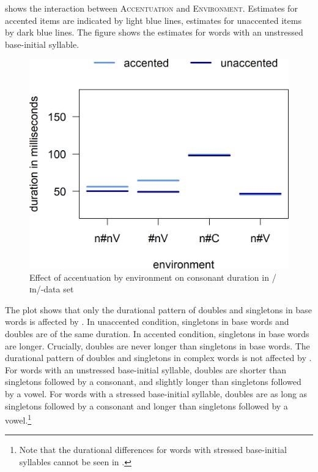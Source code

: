  shows the interaction between \textsc{Accentuation} and \textsc{Environment}. Estimates for accented items are indicated by light blue lines, estimates for unaccented items by dark blue lines. The figure shows the estimates for words with an unstressed base-initial syllable. 


	\begin{figure}
		
		
		\includegraphics [scale=0.5] {images/Experiment/InModelCompleteInterEnvAcc} 
		\caption{Effect of accentuation by environment on consonant duration in /ɪn/-data set}
		\label{fig:Env Acc In complete experiment}
	\end{figure}

\largerpage The plot shows that only the durational pattern of doubles and singletons in base words is affected by . 
In unaccented condition, singletons in base words and doubles are of the same duration. In accented condition, singletons in base words are longer. Crucially, doubles are never longer than singletons in base words.
The durational pattern of doubles and singletons in complex words is not affected by . For words with an unstressed base-initial syllable, doubles are shorter than singletons followed by a consonant, and slightly longer than singletons followed by a vowel. For words with a stressed base-initial syllable, doubles are as long as singletons followed by a consonant and longer than singletons followed by a vowel.\footnote{Note that the durational differences for words with stressed base-initial syllables cannot be seen in .} 


